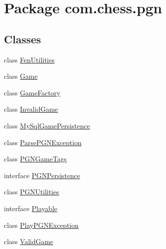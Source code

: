 \hypertarget{namespacecom_1_1chess_1_1pgn}{}\section{Package com.\+chess.\+pgn}
\label{namespacecom_1_1chess_1_1pgn}
\subsection*{Classes}
\begin{DoxyCompactItemize}
\item 
class \mbox{\hyperlink{classcom_1_1chess_1_1pgn_1_1_fen_utilities}{Fen\+Utilities}}
\item 
class \mbox{\hyperlink{classcom_1_1chess_1_1pgn_1_1_game}{Game}}
\item 
class \mbox{\hyperlink{classcom_1_1chess_1_1pgn_1_1_game_factory}{Game\+Factory}}
\item 
class \mbox{\hyperlink{classcom_1_1chess_1_1pgn_1_1_invalid_game}{Invalid\+Game}}
\item 
class \mbox{\hyperlink{classcom_1_1chess_1_1pgn_1_1_my_sql_game_persistence}{My\+Sql\+Game\+Persistence}}
\item 
class \mbox{\hyperlink{classcom_1_1chess_1_1pgn_1_1_parse_p_g_n_exception}{Parse\+P\+G\+N\+Exception}}
\item 
class \mbox{\hyperlink{classcom_1_1chess_1_1pgn_1_1_p_g_n_game_tags}{P\+G\+N\+Game\+Tags}}
\item 
interface \mbox{\hyperlink{interfacecom_1_1chess_1_1pgn_1_1_p_g_n_persistence}{P\+G\+N\+Persistence}}
\item 
class \mbox{\hyperlink{classcom_1_1chess_1_1pgn_1_1_p_g_n_utilities}{P\+G\+N\+Utilities}}
\item 
interface \mbox{\hyperlink{interfacecom_1_1chess_1_1pgn_1_1_playable}{Playable}}
\item 
class \mbox{\hyperlink{classcom_1_1chess_1_1pgn_1_1_play_p_g_n_exception}{Play\+P\+G\+N\+Exception}}
\item 
class \mbox{\hyperlink{classcom_1_1chess_1_1pgn_1_1_valid_game}{Valid\+Game}}
\end{DoxyCompactItemize}
